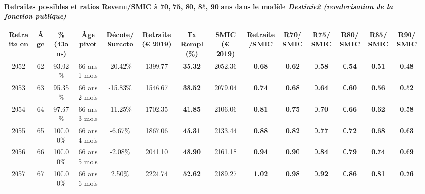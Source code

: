 \vspace{0.1cm} 
{\bf \noindent Retraites possibles et ratios Revenu/SMIC à 70, 75, 80, 85, 90 ans dans le modèle \emph{Destinie2 (revalorisation de la fonction publique)}}  
 
\begin{adjustbox}{max width=\textwidth} 
\begin{tabular}[htb]{|c|c||c|c|c||c|c||c|c||c|c|c|c|c|} 
\hline 
 Retraite en &  Âge &  \%(43ans) &  Âge pivot &  Décote/Surcote &  Retraite (\euro{} 2019) &  Tx Rempl(\%) &  SMIC (\euro{} 2019) &  Retraite/SMIC &  R70/SMIC &  R75/SMIC &  R80/SMIC &  R85/SMIC &  R90/SMIC \\ 
\hline \hline 
 2052 &  62 &  93.02\% &  66 ans 1 mois &  -20.42\% &  1399.77 &  {\bf 35.32} &  2052.36 &  {\bf {\color{red} 0.68}} &  {\bf {\color{red} 0.62}} &  {\bf {\color{red} 0.58}} &  {\bf {\color{red} 0.54}} &  {\bf {\color{red} 0.51}} &  {\bf {\color{red} 0.48}} \\ 
\hline 
 2053 &  63 &  95.35\% &  66 ans 2 mois &  -15.83\% &  1546.67 &  {\bf 38.52} &  2079.04 &  {\bf {\color{red} 0.74}} &  {\bf {\color{red} 0.68}} &  {\bf {\color{red} 0.64}} &  {\bf {\color{red} 0.60}} &  {\bf {\color{red} 0.56}} &  {\bf {\color{red} 0.52}} \\ 
\hline 
 2054 &  64 &  97.67\% &  66 ans 3 mois &  -11.25\% &  1702.35 &  {\bf 41.85} &  2106.06 &  {\bf {\color{red} 0.81}} &  {\bf {\color{red} 0.75}} &  {\bf {\color{red} 0.70}} &  {\bf {\color{red} 0.66}} &  {\bf {\color{red} 0.62}} &  {\bf {\color{red} 0.58}} \\ 
\hline 
 2055 &  65 &  100.00\% &  66 ans 4 mois &  -6.67\% &  1867.06 &  {\bf 45.31} &  2133.44 &  {\bf {\color{red} 0.88}} &  {\bf {\color{red} 0.82}} &  {\bf {\color{red} 0.77}} &  {\bf {\color{red} 0.72}} &  {\bf {\color{red} 0.68}} &  {\bf {\color{red} 0.63}} \\ 
\hline 
 2056 &  66 &  100.00\% &  66 ans 5 mois &  -2.08\% &  2041.10 &  {\bf 48.90} &  2161.18 &  {\bf {\color{red} 0.94}} &  {\bf {\color{red} 0.90}} &  {\bf {\color{red} 0.84}} &  {\bf {\color{red} 0.79}} &  {\bf {\color{red} 0.74}} &  {\bf {\color{red} 0.69}} \\ 
\hline 
 2057 &  67 &  100.00\% &  66 ans 6 mois &  2.50\% &  2224.74 &  {\bf 52.62} &  2189.27 &  {\bf 1.02} &  {\bf {\color{red} 0.98}} &  {\bf {\color{red} 0.92}} &  {\bf {\color{red} 0.86}} &  {\bf {\color{red} 0.81}} &  {\bf {\color{red} 0.76}} \\ 
\hline 
\hline 
\end{tabular} 
\end{adjustbox} 
 
